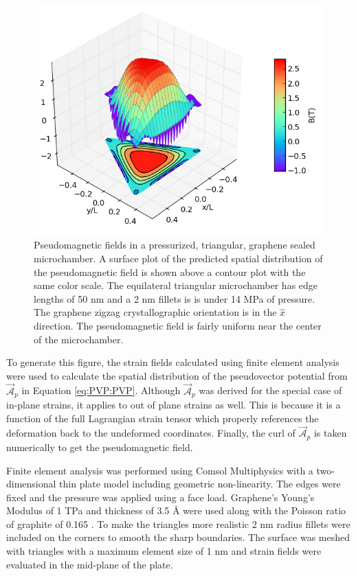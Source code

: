 \begin{figure}
  \begin{center}
  \includegraphics[scale=.75]{Figs_PVP/Triangle_PMF.png}
  \end{center}
  \caption[Pseudomagnetic fields in a pressurized, triangular, graphene sealed microchamber]{\label{fig:PVP:triangle} Pseudomagnetic fields in a pressurized, triangular, graphene sealed microchamber.
  A surface plot of the predicted spatial distribution of the pseudomagnetic field is shown above a contour plot with the same color scale.
  The equilateral triangular microchamber has edge lengths of 50 nm and a 2 nm fillets is is under 14 MPa of pressure.
  The graphene zigzag crystallographic orientation is in the $\hat{x}$ direction.
  The pseudomagnetic field is fairly uniform near the center of the microchamber.
  }
\end{figure}

To generate this figure, the strain fields calculated using finite element analysis were used to calculate the spatial distribution of the pseudovector potential from $\vec{\mathcal{A}}_p$ in Equation \ref{eq:PVP:PVP}.
Although $\vec{\mathcal{A}}_p$ was derived for the special case of in-plane strains, it applies to out of plane strains as well.
This is because it is a function of the full Lagrangian strain tensor which properly references the deformation back to the undeformed coordinates.
Finally, the curl of $\vec{\mathcal{A}}_p$ is taken numerically to get the pseudomagnetic field.

Finite element analysis was performed using Comsol Multiphysics with a two-dimensional thin plate model including geometric non-linearity.
The edges were fixed and the pressure was applied using a face load.
Graphene's Young's Modulus of 1 TPa and thickness of 3.5 \AA \cite{Lee2008} were used along with the Poisson ratio of graphite of 0.165 \cite{Blakslee1970}.
To make the triangles more realistic 2 nm radius fillets were included on the corners to smooth the sharp boundaries.
The surface was meshed with triangles with a maximum element size of 1 nm and strain fields were evaluated in the mid-plane of the plate.


